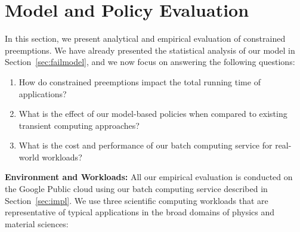\vspace*{\subsecspace}
\section{Model and Policy Evaluation}
\label{sec:eval}

%


In this section, we present analytical and empirical evaluation of constrained preemptions.
We have already presented the statistical analysis of our model in Section~\ref{sec:failmodel}, and we now focus on answering the following questions: 

\begin{enumerate}
\item How do constrained preemptions impact the total running time of applications?

\item  What is the effect of our model-based policies when compared to existing transient computing approaches?


\item What is the cost and performance of our batch computing service for real-world workloads? 
  
\end{enumerate}




\noindent \textbf{Environment and Workloads:}
All our empirical evaluation is conducted on the Google Public cloud using our batch computing service described in Section~\ref{sec:impl}. 
We use three scientific computing workloads that are representative of typical applications in the broad domains of physics and material sciences:%

